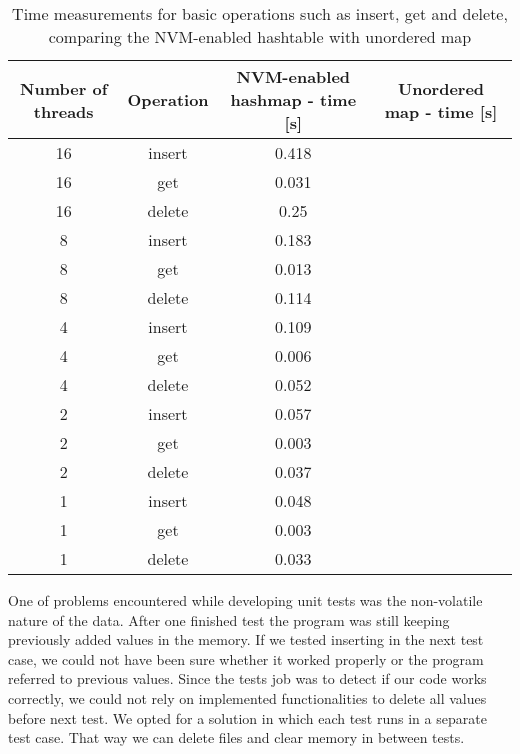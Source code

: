     \begin{table}[h]
    \caption{Time measurements for basic operations such as insert, get and delete, comparing the NVM-enabled hashtable with unordered map}\label{tab:tabela}
    \centering\footnotesize%
        \begin{tabular}{|c|c|c|c|} 
            \toprule
            Number of threads & Operation & NVM-enabled hashmap - time [s] & Unordered map - time [s] \\
            \midrule
            16 & insert & 0.418 & \\
            16 & get & 0.031 &    \\
            16 & delete & 0.25 &  \\
            \midrule
            8 & insert & 0.183 &  \\
            8 & get & 0.013 &     \\
            8 & delete & 0.114 &  \\
            \midrule
            4 & insert & 0.109 &  \\
            4 & get & 0.006 &     \\
            4 & delete & 0.052 &  \\
            \midrule
            2 & insert & 0.057 &  \\
            2 & get & 0.003 &     \\
            2 & delete & 0.037 &  \\
            \midrule
            1 & insert & 0.048 &  \\
            1 & get & 0.003 &     \\
            1 & delete & 0.033 &  \\
            \bottomrule
        \end{tabular}
    \end{table}

    One of problems encountered while developing unit tests was the non-volatile nature of the data. After one finished test the program was still keeping previously added values in the memory. If we tested inserting in the next test case, we could not have been sure whether it worked properly or the program referred to previous values. Since the tests job was to detect if our code works correctly, we could not rely on implemented functionalities to delete all values before next test. We opted for a solution in which each test runs in a separate test case. That way we can delete files and clear memory in between tests.


